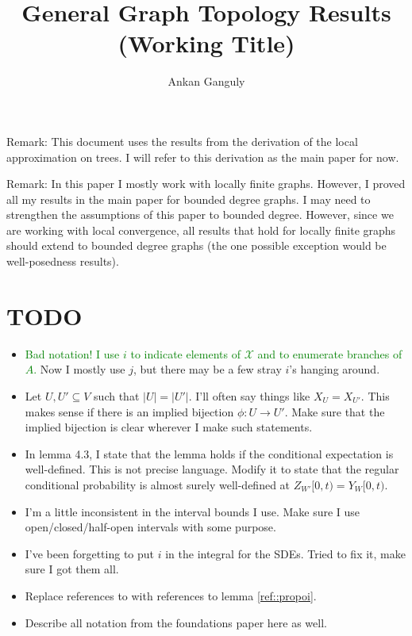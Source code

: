 \documentclass[12pt]{article}
\newcommand{\skipLine}{\vspace{12pt}}
\newcommand{\mc}{\mathcal}
\newcommand{\ra}{\rightarrow}
\newcommand{\tg}{\textcolor{green}}
\newcommand{\sta}{\mc{X}}							%
\newcommand{\Xf}{X}									%
\newcommand{\vind}[1]{_{#1}}						%
\newcommand{\tmi}[1]{#1}							%
\newcommand{\Xg}{Y}									%
\newcommand{\Xh}{Z}									%
\begin{document}
\title{General Graph Topology Results (Working Title)}
\author{Ankan Ganguly}

\maketitle

Remark: This document uses the results from the derivation of the local approximation on trees. I will refer to this derivation as the main paper for now.

\skipLine

Remark: In this paper I mostly work with locally finite graphs. However, I proved all my results in the main paper for bounded degree graphs. I may need to strengthen the assumptions of this paper to bounded degree. However, since we are working with local convergence, all results that hold for locally finite graphs should extend to bounded degree graphs (the one possible exception would be well-posedness results).

\tableofcontents

\section{TODO}

\begin{itemize}
\item \tg{Bad notation! I use \(i\) to indicate elements of \(\sta\) and to enumerate branches of \(A\).} Now I mostly use \(j\), but there may be a few stray \(i\)'s hanging around.

\item Let \(U,U'\subseteq V\) such that \(|U| = |U'|\). I'll often say things like \(\Xf\vind{U} = \Xf\vind{U'}\). This makes sense if there is an implied bijection \(\phi:U \ra U'\). Make sure that the implied bijection is clear wherever I make such statements.

\item In lemma 4.3, I state that the lemma holds if the conditional expectation is well-defined. This is not precise language. Modify it to state that the regular conditional probability is almost surely well-defined at \(\Xh\vind{W'}\tmi{[0,t)} = \Xg\vind{W}\tmi{[0,t)}\).

\item I'm a little inconsistent in the interval bounds I use. Make sure I use open/closed/half-open intervals with some purpose.

\item I've been forgetting to put \(i\) in the integral for the SDEs. Tried to fix it, make sure I got them all.

\item Replace references to \cite[exercise 14.7.I]{DalVer08} with references to lemma \ref{ref::propoi}.

\item Describe all notation from the foundations paper here as well.
\end{itemize}
\end{document}

